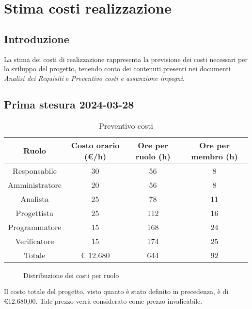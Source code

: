 
\section{Stima costi realizzazione}
\subsection{Introduzione}
La stima dei costi di realizzazione rappresenta la previsione dei costi necessari per lo sviluppo del progetto, tenendo conto dei contenuti presenti nei documenti \textit{Analisi dei Requisiti} e \textit{Preventivo costi e assunzione impegni}.
\subsection{Prima stesura 2024-03-28}
\begin{table}[!h]
	\centering
		\begin{tabular}{ | c | c | c | c | }
			\hline
			\textbf{Ruolo}   & \textbf{Costo orario (€/h)} & \textbf{Ore per ruolo (h)} & \textbf{Ore per membro (h)} \\
			\hline
			Responsabile   & 30           & 56            & 8              \\
			Amministratore & 20           & 56            & 8              \\
			Analista       & 25           & 78            & 11             \\
			Progettista    & 25           & 112           & 16             \\
			Programmatore  & 15           & 168           & 24             \\
			Verificatore   & 15           & 174           & 25             \\
			\hline
			Totale         & € 12.680     & 644           & 92             \\
			\hline
		\end{tabular}
        \caption{Preventivo costi}
    \label{tab:12}
\end{table}
\begin{figure}[!h]
    \centering
    \caption{Distribuzione dei costi per ruolo}
    \label{fig:1}
\end{figure}
\begin{flushleft}
Il costo totale del progetto, visto quanto è stato definito in precedenza, è di €12.680,00. Tale prezzo verrà considerato come prezzo invalicabile.
\end{flushleft}
